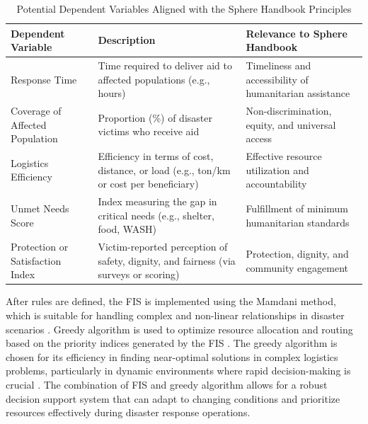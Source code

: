 \documentclass[journal,final,a4paper,twoside,11pt]{IEEEtran}
\begin{document}
\begin{table}[H]
\caption{Potential Dependent Variables Aligned with the Sphere Handbook Principles}
\begin{center}
\begin{tabular}{|p{2cm}|p{2cm}|p{2cm}|}
\hline
\textbf{Dependent Variable} & \textbf{Description} & \textbf{Relevance to Sphere Handbook} \\
\hline
Response Time & Time required to deliver aid to affected populations (e.g., hours) & Timeliness and accessibility of humanitarian assistance \\
\hline
Coverage of Affected Population & Proportion (\%) of disaster victims who receive aid & Non-discrimination, equity, and universal access \\
\hline
Logistics Efficiency & Efficiency in terms of cost, distance, or load (e.g., ton/km or cost per beneficiary) & Effective resource utilization and accountability \\
\hline
Unmet Needs Score & Index measuring the gap in critical needs (e.g., shelter, food, WASH) & Fulfillment of minimum humanitarian standards \\
\hline
Protection or Satisfaction Index & Victim-reported perception of safety, dignity, and fairness (via surveys or scoring) & Protection, dignity, and community engagement \\
\hline
\end{tabular}
\label{tab:dependent_variables_sphere}
\end{center}
\end{table}


After rules are defined, the FIS is implemented using the Mamdani method, which is suitable for handling complex and non-linear relationships in disaster scenarios \cite{herpratiwi2022implementation}. Greedy algorithm is used to optimize resource allocation and routing based on the priority indices generated by the FIS \cite{shirmarz2020adaptive}. The greedy algorithm is chosen for its efficiency in finding near-optimal solutions in complex logistics problems, particularly in dynamic environments where rapid decision-making is crucial \cite{hamidouglu2023game}. The combination of FIS and greedy algorithm allows for a robust decision support system that can adapt to changing conditions and prioritize resources effectively during disaster response operations. 
\end{document}
